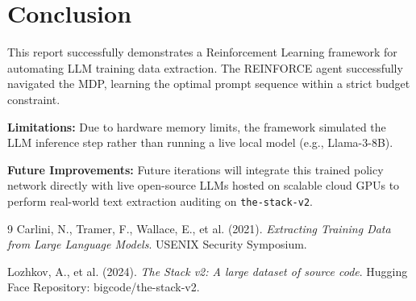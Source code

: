 \documentclass[11pt, a4paper]{article}
\begin{document}
\section{Conclusion}
This report successfully demonstrates a Reinforcement Learning framework for automating LLM training data extraction. The REINFORCE agent successfully navigated the MDP, learning the optimal prompt sequence within a strict budget constraint. 

\textbf{Limitations:} Due to hardware memory limits, the framework simulated the LLM inference step rather than running a live local model (e.g., Llama-3-8B). 

\textbf{Future Improvements:} Future iterations will integrate this trained policy network directly with live open-source LLMs hosted on scalable cloud GPUs to perform real-world text extraction auditing on \texttt{the-stack-v2}.

\begin{thebibliography}{9}
Carlini, N., Tramer, F., Wallace, E., et al. (2021). 
\textit{Extracting Training Data from Large Language Models}. 
USENIX Security Symposium.

Lozhkov, A., et al. (2024).
\textit{The Stack v2: A large dataset of source code}. 
Hugging Face Repository: bigcode/the-stack-v2.
\end{thebibliography}
\end{document}
